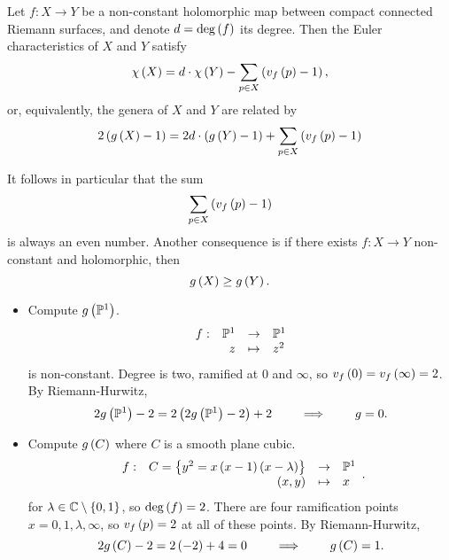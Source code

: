 \begin{theorem}
Let $ f : X \to Y $ be a non-constant holomorphic map between compact connected Riemann surfaces, and denote $ d = \deg\left( f \right) $ its degree. Then the Euler characteristics of $ X $ and $ Y $ satisfy
$$ \chi\left( X \right) = d \cdot \chi\left( Y \right) - \sum_{p \in X} \left( v_f\left( p \right) - 1 \right), $$
or, equivalently, the genera of $ X $ and $ Y $ are related by
$$ 2\left( g\left( X \right) - 1 \right) = 2d \cdot \left( g\left( Y \right) - 1 \right) + \sum_{p \in X} \left( v_f\left( p \right) - 1 \right) $$
\end{theorem}

\begin{remark}
It follows in particular that the sum
$$ \sum_{p \in X} \left( v_f\left( p \right) - 1 \right) $$
is always an even number. Another consequence is if there exists $ f : X \to Y $ non-constant and holomorphic, then
$$ g\left( X \right) \ge g\left( Y \right). $$
\end{remark}

\begin{example*}
\hfill
\begin{itemize}
\item Compute $ g\left( \mathbb{P}^1 \right) $.
$$ \function[f]{\P^1}{\P^1}{z}{z^2} $$
is non-constant. Degree is two, ramified at $ 0 $ and $ \infty $, so $ v_f\left( 0 \right) = v_f\left( \infty \right) = 2 $. By Riemann-Hurwitz,
$$ 2g\left( \mathbb{P}^1 \right) - 2 = 2\left( 2g\left( \mathbb{P}^1 \right) - 2 \right) + 2 \qquad \implies \qquad g = 0. $$
\item Compute $ g\left( C \right) $ where $ C $ is a smooth plane cubic.
$$ \function[f]{C = \cb{y^2 = x\rb{x - 1}\rb{x - \lambda}}}{\P^1}{\rb{x, y}}{x}. $$
for $ \lambda \in \mathbb{C} \setminus \left\{ 0, 1 \right\} $, so $ \deg\left( f \right) = 2 $. There are four ramification points $ x = 0, 1, \lambda, \infty $, so $ v_f\left( p \right) = 2 $ at all of these points. By Riemann-Hurwitz,
$$ 2g\left( C \right) - 2 = 2\left( -2 \right) + 4 = 0 \qquad \implies \qquad g\left( C \right) = 1. $$
\end{itemize}
\end{example*}

